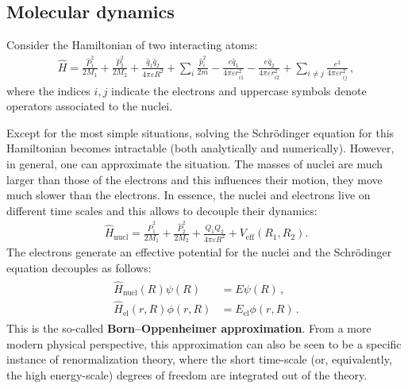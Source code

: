 
\subsection{Molecular dynamics}

    Consider the Hamiltonian of two interacting atoms:
    \begin{gather}
        \widehat{H} = \frac{\widehat{P}_1^2}{2M_1} + \frac{\widehat{P}_2^2}{2M_2} + \frac{\widehat{q}_1\widehat{q}_2}{4\pi\varepsilon R^2} + \sum_i\frac{\widehat{p}_i^2}{2m} - \frac{e\widehat{q}_1}{4\pi\varepsilon r_{i1}^2} - \frac{e\widehat{q}_2}{4\pi\varepsilon r_{i2}^2} + \sum_{i\neq j}\frac{e^2}{4\pi\varepsilon r_{ij}^2}\,,
    \end{gather}
    where the indices $i,j$ indicate the electrons and uppercase symbols denote operators associated to the nuclei.

    Except for the most simple situations, solving the Schr\"odinger equation for this Hamiltonian becomes intractable (both analytically and numerically). However, in general, one can approximate the situation. The masses of nuclei are much larger than those of the electrons and this influences their motion, they move much slower than the electrons. In essence, the nuclei and electrons live on different time scales and this allows to decouple their dynamics:
    \begin{gather}
        \widehat{H}_{\text{nucl}} = \frac{\widehat{P}_1^2}{2M_1} + \frac{\widehat{P}_2^2}{2M_2} + \frac{Q_1Q_2}{4\pi\varepsilon R^2} + V_{\text{eff}}(R_1,R_2).
    \end{gather}
    The electrons generate an effective potential for the nuclei and the Schr\"odinger equation decouples as follows:
    \begin{gather}
        \begin{aligned}
            \widehat{H}_{\text{nucl}}(R)\psi(R) &= E\psi(R)\,,\\
            \widehat{H}_{\text{el}}(r,R)\phi(r,R) &= E_{\text{el}}\phi(r,R)\,.
        \end{aligned}
    \end{gather}
    This is the so-called \textbf{Born--Oppenheimer approximation}. From a more modern physical perspective, this approximation can also be seen to be a specific instance of renormalization theory, where the short time-scale (or, equivalently, the high energy-scale) degrees of freedom are integrated out of the theory.

